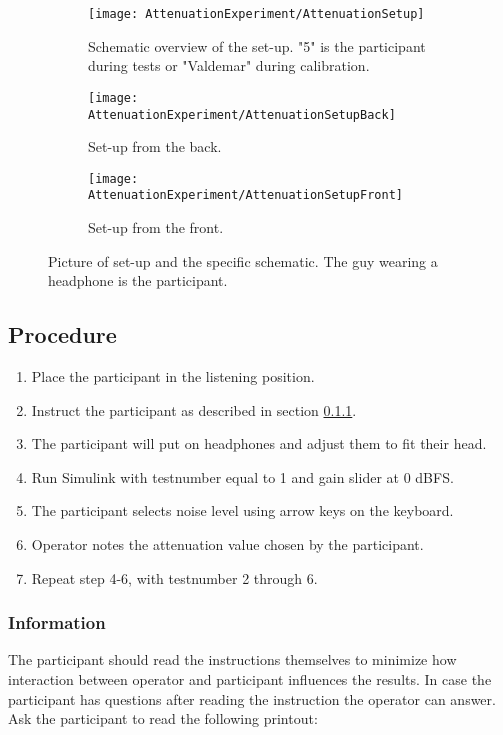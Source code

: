 \begin{figure}[H]
\centering
  \begin{subfigure}[b]{0.5\textwidth}
  \centering
%	
	\texttt{[image: AttenuationExperiment/AttenuationSetup]}
	\caption{Schematic overview of the set-up. "5" is the participant during tests or "Valdemar" during calibration.}
	\label{fig:AttenuationSetup}
  \end{subfigure}\qquad
    \begin{subfigure}[b]{0.4\textwidth}
    \texttt{[image: AttenuationExperiment/AttenuationSetupBack]}
    \caption{Set-up from the back.}
    \label{fig:SetupFront}
\vspace{2ex}
    \texttt{[image: AttenuationExperiment/AttenuationSetupFront]}
    \caption{Set-up from the front.}
    \label{fig:SetupBack}
  \end{subfigure}
  \caption{Picture of set-up and the specific schematic. The guy wearing a headphone is the participant.}
\end{figure}


\subsection{Procedure}
\begin{enumerate}
	\item Place the participant in the listening position.
	\item Instruct the participant as described in section \ref{subsubsec:attenuationInformation}.
	\item The participant will put on headphones and adjust them to fit their head.
	\item Run Simulink  with testnumber equal to 1 and gain slider at 0 dBFS.
	\item The participant selects noise level using arrow keys on the keyboard.
	\item Operator notes the attenuation value chosen by the participant.
	\item Repeat step 4-6, with testnumber 2 through 6.
\end{enumerate}

\subsubsection{Information}\label{subsubsec:attenuationInformation}
The participant should read the instructions themselves to minimize how interaction between operator and participant influences the results. In case the participant has questions after reading the instruction the operator can answer.   
Ask the participant to read the following printout:

